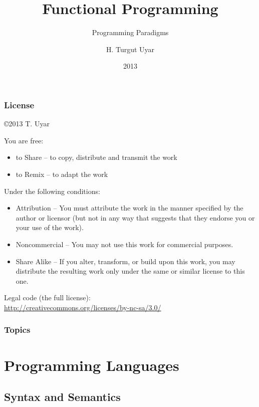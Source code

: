 \documentclass[dvipsnames]{beamer}
\title{Functional Programming}
\subtitle{Programming Paradigms}
\author{H. Turgut Uyar}
\date{2013}
\theoremstyle{plain}
\begin{document}
\begin{frame}
  \titlepage
\end{frame}

\begin{frame}
  \frametitle{License}

  \hfill
  \copyright 2013 T. Uyar

  \vfill
  \begin{tiny}
    You are free:
    \begin{itemize}
      \item to Share -- to copy, distribute and transmit the work
      \item to Remix -- to adapt the work
    \end{itemize}

    Under the following conditions:
    \begin{itemize}
      \item Attribution -- You must attribute the work in the manner specified by
        the author or licensor (but not in any way that suggests that they
        endorse you or your use of the work).

      \item Noncommercial -- You may not use this work for commercial purposes.

      \item Share Alike -- If you alter, transform, or build upon this work, you
        may distribute the resulting work only under the same or similar license
        to this one.
    \end{itemize}
  \end{tiny}

  \vfill
  Legal code (the full license):\\
  \url{http://creativecommons.org/licenses/by-nc-sa/3.0/}
\end{frame}

\begin{frame}
  \frametitle{Topics}
  \tableofcontents
\end{frame}

\section{Programming Languages}

\subsection{Syntax and Semantics}
\end{document}
